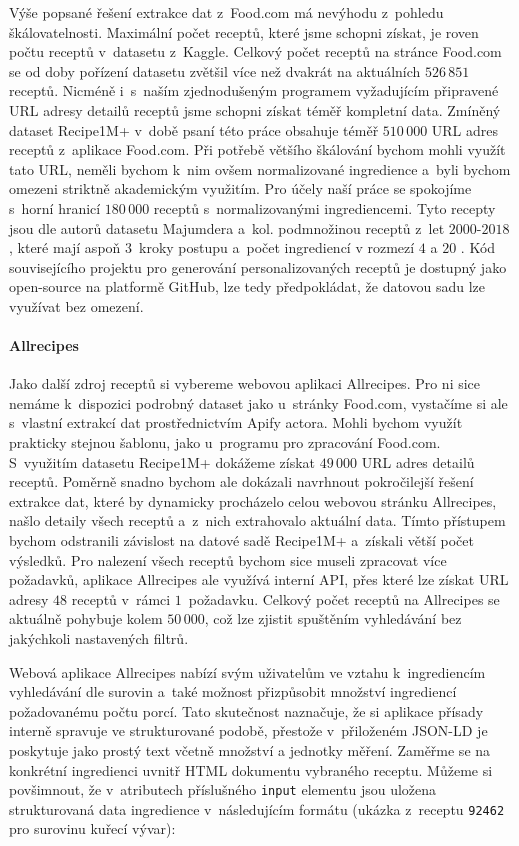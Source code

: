 Výše popsané řešení extrakce dat z~Food.com má nevýhodu z~pohledu škálovatelnosti. Maximální počet receptů, které jsme schopni získat, je roven počtu receptů v~datasetu z~Kaggle. Celkový počet receptů na stránce Food.com se od doby pořízení datasetu zvětšil více než dvakrát na aktuálních $526\,851$ receptů. Nicméně i~s~naším zjednodušeným programem vyžadujícím připravené URL adresy detailů receptů jsme schopni získat téměř kompletní data. Zmíněný dataset Recipe1M+ v~době psaní této práce obsahuje téměř $510\,000$ URL adres receptů z~aplikace Food.com. Při potřebě většího škálování bychom mohli využít tato URL, neměli bychom k~nim ovšem normalizované ingredience a~byli bychom omezeni striktně akademickým využitím. Pro účely naší práce se spokojíme s~horní hranicí $180\,000$ receptů s~normalizovanými ingrediencemi. Tyto recepty jsou dle autorů datasetu Majumdera a~kol. podmnožinou receptů z~let $2000$-$2018$, které mají aspoň $3$~kroky postupu a~počet ingrediencí v rozmezí $4$ a $20$ \citep{majumder-etal-2019-generating}. Kód souvisejícího projektu pro generování personalizovaných receptů je dostupný jako open-source na platformě GitHub, lze tedy předpokládat, že datovou sadu lze využívat bez omezení.

\paragraph{Allrecipes}

Jako další zdroj receptů si vybereme webovou aplikaci Allrecipes. Pro ni sice nemáme k~dispozici podrobný dataset jako u~stránky Food.com, vystačíme si ale s~vlastní extrakcí dat prostřednictvím Apify actora. Mohli bychom využít prakticky stejnou šablonu, jako u~programu pro zpracování Food.com. S~využitím datasetu Recipe1M+ dokážeme získat $49\,000$ URL adres detailů receptů. Poměrně snadno bychom ale dokázali navrhnout pokročilejší řešení extrakce dat, které by dynamicky procházelo celou webovou stránku Allrecipes, našlo detaily všech receptů a~z~nich extrahovalo aktuální data. Tímto přístupem bychom odstranili závislost na datové sadě Recipe1M+ a~získali větší počet výsledků. Pro nalezení všech receptů bychom sice museli zpracovat více požadavků, aplikace Allrecipes ale využívá interní API, přes které lze získat URL adresy $48$ receptů v~rámci $1$~požadavku. Celkový počet receptů na Allrecipes se aktuálně pohybuje kolem $50\,000$, což lze zjistit spuštěním vyhledávání bez jakýchkoli nastavených filtrů.

Webová aplikace Allrecipes nabízí svým uživatelům ve vztahu k~ingrediencím vyhledávání dle surovin a~také možnost přizpůsobit množství ingrediencí požadovanému počtu porcí. Tato skutečnost naznačuje, že si aplikace přísady interně spravuje ve strukturované podobě, přestože v~přiloženém JSON-LD je poskytuje jako prostý text včetně množství a jednotky měření. Zaměřme se na konkrétní ingredienci uvnitř HTML dokumentu vybraného receptu. Můžeme si povšimnout, že v~atributech příslušného \texttt{input} elementu jsou uložena strukturovaná data ingredience v~následujícím formátu (ukázka z~receptu \texttt{92462} pro surovinu kuřecí vývar):

